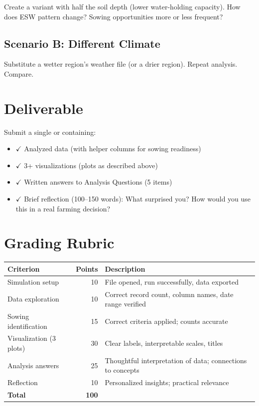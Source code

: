 Create a variant with half the soil depth (lower water-holding capacity). How does ESW pattern change? Sowing opportunities more or less frequent?

\subsection{Scenario B: Different Climate}

Substitute a wetter region's weather file (or a drier region). Repeat analysis. Compare.

\section{Deliverable}

Submit a single  or  containing:

\begin{itemize}
  \item $\checkmark$ Analyzed data (with helper columns for sowing readiness)
  \item $\checkmark$ 3+ visualizations (plots as described above)
  \item $\checkmark$ Written answers to Analysis Questions (5 items)
  \item $\checkmark$ Brief reflection (100--150 words): What surprised you? How would you use this in a real farming decision?
\end{itemize}

\section{Grading Rubric}

\begin{table}[H]
\centering
\begin{tabularx}{\textwidth}{l|r|X}
\toprule
\textbf{Criterion} & \textbf{Points} & \textbf{Description} \\
\midrule
Simulation setup & 10 & File opened, run successfully, data exported \\
Data exploration & 10 & Correct record count, column names, date range verified \\
Sowing identification & 15 & Correct criteria applied; counts accurate \\
Visualization (3 plots) & 30 & Clear labels, interpretable scales, titles \\
Analysis answers & 25 & Thoughtful interpretation of data; connections to concepts \\
Reflection & 10 & Personalized insights; practical relevance \\
\midrule
\textbf{Total} & \textbf{100} & \\
\bottomrule
\end{tabularx}
\end{table}

